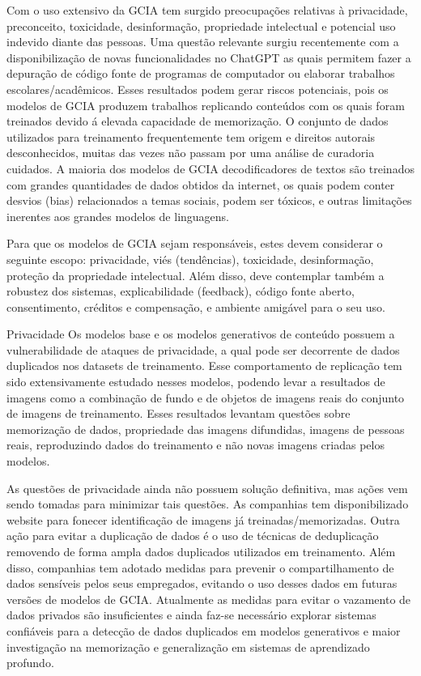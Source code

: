 Com o uso extensivo da GCIA tem surgido preocupações relativas à privacidade, preconceito, toxicidade, desinformação, propriedade intelectual e potencial uso indevido diante das pessoas. Uma questão relevante surgiu recentemente com a disponibilização de novas funcionalidades no ChatGPT as quais permitem fazer a depuração de código fonte de programas de computador ou elaborar trabalhos escolares/acadêmicos. Esses resultados podem gerar riscos potenciais, pois os modelos de GCIA produzem trabalhos replicando conteúdos com os quais foram treinados devido á elevada capacidade de memorização. O conjunto de dados utilizados para treinamento frequentemente tem origem e direitos autorais desconhecidos, muitas das vezes não passam por uma análise de curadoria cuidados. A maioria dos modelos de GCIA decodificadores de textos são treinados com grandes quantidades de dados obtidos da internet, os quais podem conter desvios (bias) relacionados a temas sociais, podem ser tóxicos, e outras limitações inerentes aos grandes modelos de linguagens.

Para que os modelos de GCIA sejam responsáveis, estes devem considerar o seguinte escopo: privacidade, viés (tendências), toxicidade, desinformação, proteção da propriedade intelectual. Além disso, deve contemplar também a robustez dos sistemas, explicabilidade (feedback), código fonte aberto, consentimento, créditos e compensação, e ambiente amigável para o seu uso.


Privacidade
Os modelos base e os modelos generativos de conteúdo possuem a vulnerabilidade de ataques de privacidade, a qual pode ser decorrente de dados duplicados nos datasets de treinamento. Esse comportamento de replicação tem sido extensivamente estudado nesses modelos, podendo levar a resultados de imagens como a combinação de fundo e de objetos de imagens reais do conjunto de imagens de treinamento. Esses resultados levantam questões sobre memorização de dados, propriedade das imagens difundidas, imagens de pessoas reais, reproduzindo dados do treinamento e não novas imagens criadas pelos modelos.

As questões de privacidade ainda não possuem solução definitiva, mas ações vem sendo tomadas para minimizar tais questões. As companhias tem disponibilizado website para fonecer identificação de imagens já treinadas/memorizadas. Outra ação para evitar a duplicação de dados é o uso de técnicas de deduplicação removendo de forma ampla dados duplicados utilizados em treinamento. Além disso, companhias tem adotado medidas para prevenir o compartilhamento de dados sensíveis pelos seus empregados, evitando o uso desses dados em futuras versões de modelos de GCIA. Atualmente as medidas para evitar o vazamento de dados privados são insuficientes e ainda faz-se necessário explorar sistemas confiáveis para a detecção de dados duplicados em modelos generativos e maior investigação na memorização e generalização em sistemas de aprendizado profundo.


